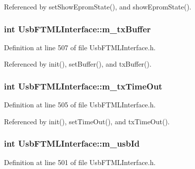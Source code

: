Referenced by setShowEpromState(), and showEpromState().\hypertarget{classUsbFTMLInterface_a4057fb62dc732ffe98df5c46231d7a23}{
\subsubsection[{m\_\-txBuffer}]{\setlength{\rightskip}{0pt plus 5cm}int {\bf UsbFTMLInterface::m\_\-txBuffer}}}
\label{classUsbFTMLInterface_a4057fb62dc732ffe98df5c46231d7a23}


Definition at line 507 of file UsbFTMLInterface.h.

Referenced by init(), setBuffer(), and txBuffer().\hypertarget{classUsbFTMLInterface_a48cd0df4e1d8fd53d96b208b5b9c7061}{
\subsubsection[{m\_\-txTimeOut}]{\setlength{\rightskip}{0pt plus 5cm}int {\bf UsbFTMLInterface::m\_\-txTimeOut}}}
\label{classUsbFTMLInterface_a48cd0df4e1d8fd53d96b208b5b9c7061}


Definition at line 505 of file UsbFTMLInterface.h.

Referenced by init(), setTimeOut(), and txTimeOut().\hypertarget{classUsbFTMLInterface_aab6754587c303660d5c498ce34a2b4c8}{
\subsubsection[{m\_\-usbId}]{\setlength{\rightskip}{0pt plus 5cm}int {\bf UsbFTMLInterface::m\_\-usbId}}}
\label{classUsbFTMLInterface_aab6754587c303660d5c498ce34a2b4c8}


Definition at line 501 of file UsbFTMLInterface.h.

